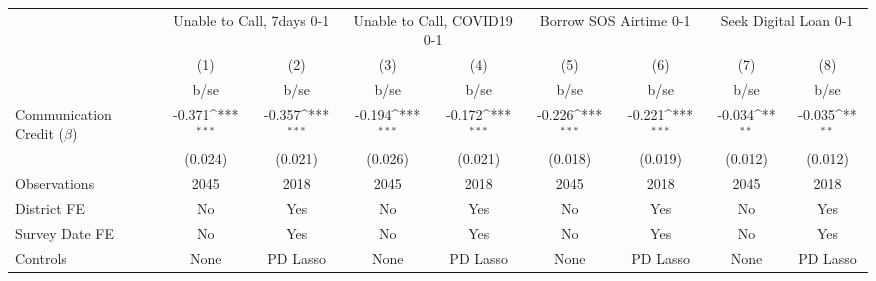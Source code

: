 {
\def\sym#1{\ifmmode^{#1}\else\(^{#1}\)\fi}
\begin{tabular}{l*{8}{c}}
\hline\hline
                                                  &\multicolumn{2}{c}{Unable to Call, 7days 0-1}&\multicolumn{2}{c}{Unable to Call, COVID19 0-1}&\multicolumn{2}{c}{Borrow SOS Airtime 0-1} &\multicolumn{2}{c}{Seek Digital Loan 0-1}  \\\cmidrule(lr){2-3}\cmidrule(lr){4-5}\cmidrule(lr){6-7}\cmidrule(lr){8-9}
                                                  &\multicolumn{1}{c}{(1)}         &\multicolumn{1}{c}{(2)}         &\multicolumn{1}{c}{(3)}         &\multicolumn{1}{c}{(4)}         &\multicolumn{1}{c}{(5)}         &\multicolumn{1}{c}{(6)}         &\multicolumn{1}{c}{(7)}         &\multicolumn{1}{c}{(8)}         \\
                                                  &        b/se         &        b/se         &        b/se         &        b/se         &        b/se         &        b/se         &        b/se         &        b/se         \\
\hline
Communication Credit ($\beta$)                    &      -0.371\sym{***}&      -0.357\sym{***}&      -0.194\sym{***}&      -0.172\sym{***}&      -0.226\sym{***}&      -0.221\sym{***}&      -0.034\sym{**} &      -0.035\sym{**} \\
                                                  &     (0.024)         &     (0.021)         &     (0.026)         &     (0.021)         &     (0.018)         &     (0.019)         &     (0.012)         &     (0.012)         \\
\hline
Observations                                      &        2045         &        2018         &        2045         &        2018         &        2045         &        2018         &        2045         &        2018         \\
District FE                                       &          No         &         Yes         &          No         &         Yes         &          No         &         Yes         &          No         &         Yes         \\
Survey Date FE                                    &          No         &         Yes         &          No         &         Yes         &          No         &         Yes         &          No         &         Yes         \\
Controls                                          &        None         &    PD Lasso         &        None         &    PD Lasso         &        None         &    PD Lasso         &        None         &    PD Lasso         \\

\end{tabular}}

